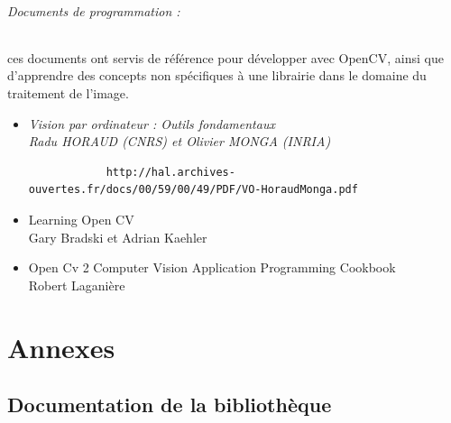 \documentclass{report}
\begin{document}
		\paragraph{Documents de programmation :}
		ces documents ont servis de référence pour développer avec OpenCV, ainsi que d'apprendre des concepts non spécifiques à une librairie dans le domaine du traitement de l'image. \\
			\begin{itemize}
			\item \it{Vision par ordinateur : Outils fondamentaux} \\
			Radu HORAUD (CNRS) et Olivier MONGA (INRIA)
			\begin{verbatim}
			http://hal.archives-ouvertes.fr/docs/00/59/00/49/PDF/VO-HoraudMonga.pdf
			\end{verbatim}
			\item Learning Open CV \\
			 Gary Bradski et Adrian Kaehler
			\item Open Cv 2 Computer Vision Application Programming Cookbook\\
			Robert Laganière
			\end{itemize}
	
	\part{Annexes}
	\appendix
		\chapter{Documentation de la bibliothèque}
		
\end{document}
